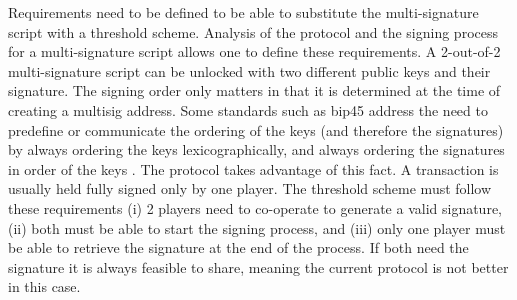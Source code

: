 Requirements need to be defined to be able to substitute the multi-signature script
with a threshold scheme. Analysis of the protocol and the signing process for a
multi-signature script allows one to define these requirements. A 2-out-of-2 multi-signature
script can be unlocked with two different public keys and their signature. The
signing order only matters in that it is determined at the time of creating a
multisig address. Some standards such as \gls{bip}45 address the need to
predefine or communicate the ordering of the keys (and therefore the signatures)
by always ordering the keys lexicographically, and always ordering the
signatures in order of the keys \cite{BIP45}.
The protocol takes advantage of this fact. A transaction is usually held fully signed
only by one player. The threshold scheme must follow these requirements (i) 2
players need to co-operate to generate a valid signature, (ii) both must be able
to start the signing process, and (iii) only one player must be able to retrieve
the signature at the end of the process. If both need the signature it is
always feasible to share, meaning the current protocol is not better in this case.
